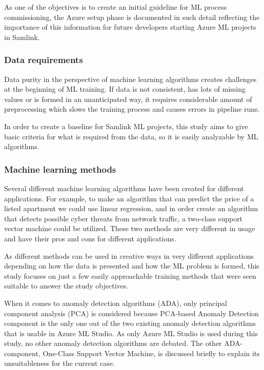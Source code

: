 As one of the objectives is to create
an initial guideline for ML process commissioning,
the Azure setup phase is documented in such detail
reflecting the importance of this information
for future developers
starting Azure ML projects in Samlink.


\subsubsection*{Data requirements}

Data purity in the perspective of machine learning algorithms
creates challenges at the beginning of ML training.
If data is not consistent,
has lots of missing values
or is formed in an unanticipated way,
it requires considerable amount of preprocessing
which slows the training process
and causes errors in pipeline runs.

In order to create a baseline for Samlink ML projects,
this study aims to give basic criteria for
what is required from the data,
so it is easily analyzable by ML algorithms.


\subsubsection*{Machine learning methods}
Several different machine learning algorithms have been created
for different applications.
For example,
to make an algorithm that can predict
the price of a listed apartment\cite{winky}
we could use linear regression,
and in order create an algorithm that detects
possible cyber threats from network traffic\cite{ghanem},
a two-class support vector machine could be utilized.
These two methods are very different in usage
and have their pros and cons for different applications.

As different methods can be used in creative ways
in very different applications
depending on how the data is presented
and how the ML problem is formed,
this study focuses on
just a few easily approachable training methods
that were seen suitable to answer the study objectives.

When it comes to anomaly detection algorithms (ADA),
only principal component analysis (PCA) is considered
because PCA-based Anomaly Detection component is the only one
out of the two existing anomaly detection algorithms
that is usable in Azure ML Studio.
As only Azure ML Studio is used during this study,
no other anomaly detection algorithms are debated.
The other ADA-component,
One-Class Support Vector Machine,
is discussed briefly to explain its unsuitableness for the current case.


